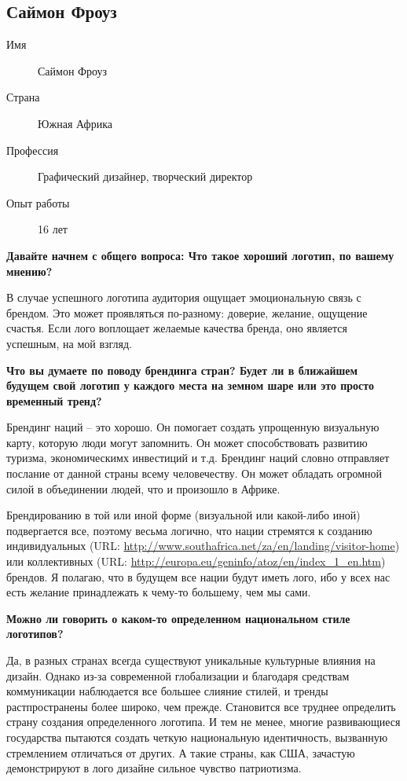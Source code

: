 \clearpage
\subsection{Саймон Фроуз}

\begin{description}
\item[Имя] Саймон Фроуз
\item[Страна] Южная Африка
\item[Профессия] Графический дизайнер, творческий директор
\item[Опыт работы] 16 лет
\end{description}

\textbf{Давайте начнем с общего вопроса: Что такое хороший логотип, по вашему мнению?}

В случае успешного логотипа аудитория ощущает эмоциональную связь с брендом. Это может проявляться по-разному: доверие, желание, ощущение счастья. Если лого воплощает желаемые качества бренда, оно является успешным, на мой взгляд.


\textbf{Что вы думаете по поводу брендинга стран? Будет ли в ближайшем будущем свой логотип у каждого места на земном шаре или это просто временный тренд?}

Брендинг наций – это хорошо. Он помогает создать упрощенную визуальную карту, которую люди могут запомнить. Он может способствовать развитию туризма, экономическимх инвестиций и т.д. Брендинг наций словно отправляет послание от данной страны всему человечеству. Он может обладать огромной силой в объединении людей, что и произошло в Африке.

Брендированию в той или иной форме (визуальной или какой-либо иной) подвергается все, поэтому весьма
логично, что нации стремятся к созданию индивидуальных
(URL: \url{http://www.southafrica.net/za/en/landing/visitor-home}) или коллективных
(URL: \url{http://europa.eu/geninfo/atoz/en/index_1_en.htm}) брендов. Я полагаю, что в будущем все нации
будут иметь лого, ибо у всех нас есть желание принадлежать к чему-то большему, чем мы сами.



\textbf{Можно ли говорить о каком-то определенном национальном стиле логотипов?}

Да, в разных странах всегда существуют уникальные культурные влияния на дизайн. Однако из-за современной глобализации и благодаря средствам коммуникации наблюдается все большее слияние стилей, и тренды растпространены более широко, чем прежде. Становится все труднее определить страну создания определенного логотипа. И тем не менее, многие развивающиеся государства пытаются создать четкую национальную идентичность, вызванную стремлением отличаться от других. А такие страны, как США, зачастую демонстрируют в лого дизайне  сильное чувство патриотизма.


